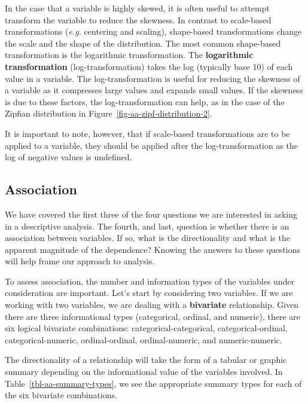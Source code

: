 \documentclass[
  letterpaper,
]{latex/krantz}
\theoremstyle{definition}
\theoremstyle{remark}
\begin{document}
In the case that a variable is highly skewed, it is often useful to
attempt transform the variable to reduce the skewness. In contrast to
scale-based transformations (\emph{e.g.} centering and scaling),
shape-based transformations change the scale and the shape of the
distribution. The most common shape-based transformation is the
logarithmic transformation. The \textbf{logarithmic transformation}
(log-transformation) takes the log (typically base 10) of each value in
a variable. The log-transformation is useful for reducing the skewness
of a variable as it compresses large values and expands small values. If
the skewness is due to these factors, the log-transformation can help,
as in the case of the Zipfian distribution in
Figure~\ref{fig-aa-zipf-distribution-2}.

It is important to note, however, that if scale-based transformations
are to be applied to a variable, they should be applied after the
log-transformation as the log of negative values is undefined.

\subsection{Association}\label{association}

We have covered the first three of the four questions we are interested
in asking in a descriptive analysis. The fourth, and last, question is
whether there is an association between variables. If so, what is the
directionality and what is the apparent magnitude of the dependence?
Knowing the answers to these questions will help frame our approach to
analysis.

To assess association, the number and information types of the variables
under consideration are important. Let's start by considering two
variables. If we are working with two variables, we are dealing with a
\textbf{bivariate} relationship. Given there are three informational
types (categorical, ordinal, and numeric), there are six logical
bivariate combinations: categorical-categorical, categorical-ordinal,
categorical-numeric, ordinal-ordinal, ordinal-numeric, and
numeric-numeric.

The directionality of a relationship will take the form of a tabular or
graphic summary depending on the informational value of the variables
involved. In Table~\ref{tbl-aa-summary-types}, we see the appropriate
summary types for each of the six bivariate combinations.
\end{document}
